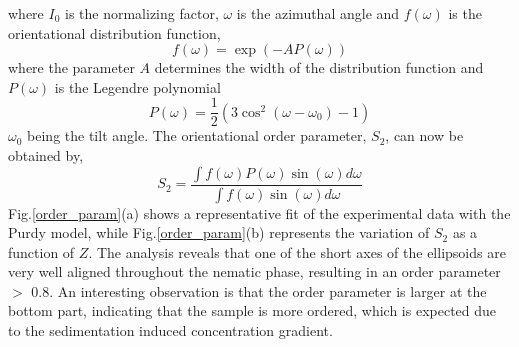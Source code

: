 \documentclass[aps,prl,preprint,superscriptaddress]{revtex4-1}
\begin{document}
\noindent where $I_0$ is the normalizing factor, $\omega$ is the azimuthal angle and $f(\omega)$ is the orientational distribution function,
\begin{equation}
\label{eq3:}
f(\omega)=\exp(-AP(\omega))
\end{equation} 
\noindent where the parameter $A$ determines the width of the distribution function and $P(\omega)$ is the Legendre polynomial
\begin{equation}
\label{eq4:}
P(\omega)=\frac{1}{2}(3\cos^2(\omega-\omega_0)-1)
\end{equation} 
\noindent $\omega_0$ being the tilt angle. The orientational order parameter, $S_2$, can now be obtained by,
\begin{equation}
\label{eq5:}
S_2= \frac{\int f(\omega)P(\omega)\sin(\omega)d\omega}{\int f(\omega)\sin(\omega)d\omega}
\end{equation}
\noindent Fig.\ref{order_param}(a) shows a representative fit of the experimental data with the Purdy model, while Fig.\ref{order_param}(b) represents the variation of $S_2$ as a function of $Z$. The analysis reveals that one of the short axes of the ellipsoids are very well aligned throughout the nematic phase, resulting in an order parameter $>$ 0.8. An interesting observation is that the order parameter is larger at the bottom part, indicating that the sample is more ordered, which is expected due to the sedimentation induced concentration gradient.\par
\end{document}
